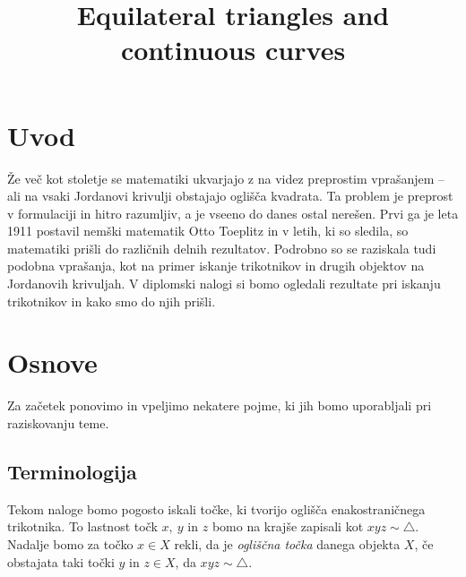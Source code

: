 \documentclass[mat1]{fmfdelo}
\title{Equilateral triangles and continuous curves}
\begin{document}
\section{Uvod}
Že več kot stoletje se matematiki ukvarjajo z na videz preprostim vprašanjem -- ali na vsaki Jordanovi krivulji obstajajo oglišča kvadrata. Ta problem je preprost v formulaciji in hitro razumljiv, a je vseeno do danes ostal nerešen. Prvi ga je leta 1911 postavil nemški matematik Otto Toeplitz \cite{splet_idaho} in v letih, ki so sledila, so matematiki prišli do različnih delnih rezultatov. Podrobno so se raziskala tudi podobna vprašanja, kot na primer iskanje trikotnikov in drugih objektov na Jordanovih krivuljah. V diplomski nalogi si bomo ogledali rezultate pri iskanju trikotnikov in kako smo do njih prišli.

\section{Osnove}

Za začetek ponovimo in vpeljimo nekatere pojme, ki jih bomo uporabljali pri raziskovanju teme.

\subsection{Terminologija}

Tekom naloge bomo pogosto iskali točke, ki tvorijo oglišča enakostraničnega trikotnika. To lastnost točk $x,\ y$ in $z$ bomo na krajše zapisali kot $xyz \sim \triangle$. Nadalje bomo za točko $x \in X$ rekli, da je \emph{ogliščna točka} danega objekta $X$, če obstajata taki točki $y$ in $z \in X$, da $xyz \sim \triangle$.
\end{document}
